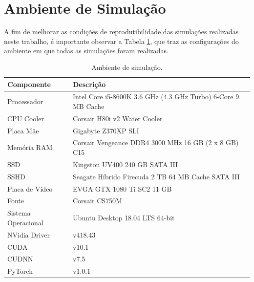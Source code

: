 \section{Ambiente de Simulação}
\label{sec:results_simulation_environment}

A fim de melhorar as condições de reprodutibilidade das simulações realizadas neste trabalho, é importante observar a Tabela \ref{tab:results_pc_specs}, que traz as configurações do ambiente em que todas as simulações foram realizadas.



\begin{table}[H]
    \centering
    \caption{Ambiente de simulação.}
    \begin{tabular}{ll}
        \toprule
        \textbf{Componente} &   \textbf{Descrição}\\
        \midrule
        \rowcolor{mColor1!30}
        Processador         &   Intel Core i5-8600K 3.6 GHz (4.3 GHz Turbo) 6-Core 9 MB Cache\\
        \rowcolor{mColor1!0}
        CPU Cooler          &   Corsair H80i v2 Water Cooler\\
        \rowcolor{mColor1!30}
        Placa Mãe           &   Gigabyte Z370XP SLI\\
        \rowcolor{mColor1!0}
        Memória RAM         &   Corsair Vengeance DDR4 3000 MHz 16 GB (2 
        x 8 GB) C15\\
        \rowcolor{mColor1!30}
        SSD                 &   Kingston UV400 240 GB SATA III\\
        \rowcolor{mColor1!0}
        SSHD                &   Seagate Híbrido Firecuda 2 TB 64 MB Cache 
        SATA III\\
        \rowcolor{mColor1!30}
        Placa de Vídeo      &   EVGA GTX 1080 Ti SC2 11 GB\\
        \rowcolor{mColor1!0}
        Fonte               &   Corsair CS750M\\
        \rowcolor{mColor1!30}
        Sistema Operacional &   Ubuntu Desktop 18.04 LTS 64-bit\\
        \rowcolor{mColor1!0}
        NVidia Driver       &   v418.43\\
        \rowcolor{mColor1!30}
        CUDA                &   v10.1\\
        \rowcolor{mColor1!0}
        CUDNN               &   v7.5\\
        \rowcolor{mColor1!30}
        PyTorch             &   v1.0.1\\
        \bottomrule
    \end{tabular}
    \label{tab:results_pc_specs}
\end{table}

